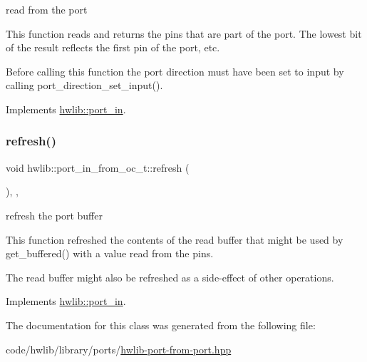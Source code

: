 read from the port

This function reads and returns the pins that are part of the port. The lowest bit of the result reflects the first pin of the port, etc.

Before calling this function the port direction must have been set to input by calling port\+\_\+direction\+\_\+set\+\_\+input(). 

Implements \hyperlink{classhwlib_1_1port__in_aa3aa277f9448c3ee493c56f05beb2ddb}{hwlib\+::port\+\_\+in}.

\mbox{\label{classhwlib_1_1port__in__from__oc__t_a2752b7d3a9e676033ad421b3ca5e903b}} 
\subsubsection{\texorpdfstring{refresh()}{refresh()}}
{\footnotesize\ttfamily void hwlib\+::port\+\_\+in\+\_\+from\+\_\+oc\+\_\+t\+::refresh (\begin{DoxyParamCaption}{ }\end{DoxyParamCaption})\hspace{0.3cm}{\ttfamily [inline]}, {\ttfamily [override]}, {\ttfamily [virtual]}}





refresh the port buffer

This function refreshed the contents of the read buffer that might be used by get\+\_\+buffered() with a value read from the pins.

The read buffer might also be refreshed as a side-\/effect of other operations. 

Implements \hyperlink{classhwlib_1_1port__in_a5d409eee35b766c844f7229fbe010545}{hwlib\+::port\+\_\+in}.



The documentation for this class was generated from the following file\+:\begin{DoxyCompactItemize}
\item 
code/hwlib/library/ports/\hyperlink{hwlib-port-from-port_8hpp}{hwlib-\/port-\/from-\/port.\+hpp}\end{DoxyCompactItemize}
